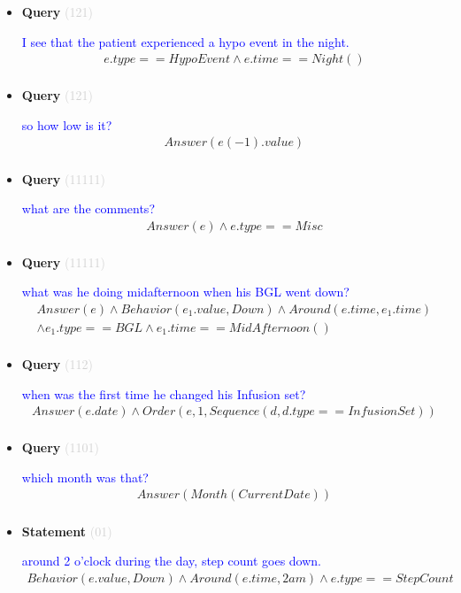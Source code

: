 \documentclass[11pt]{article}
\newcommand{\key}[1]{\textcolor{lightgray}{#1}}
\newcounter{CQuery}
\newcounter{CStatement}
\begin{document}
\begin{itemize}
\item
\textbf{Query\theCQuery} \key{(121)} \addtocounter{CQuery}{1}
\textcolor{blue}{ I see that the patient experienced a hypo event in the night. }
\begin{multline*}
e.type==HypoEvent \wedge e.time==Night() \\ 
\end{multline*}


\item
\textbf{Query\theCQuery} \key{(121)} \addtocounter{CQuery}{1}
\textcolor{blue}{ so how low is it? }
\begin{multline*}
Answer(e(-1).value) \\ 
\end{multline*}


\item
\textbf{Query\theCQuery} \key{(11111)} \addtocounter{CQuery}{1}
\textcolor{blue}{ what are the comments? }
\begin{multline*}
Answer(e) \wedge e.type==Misc \\ 
\end{multline*}


\item
\textbf{Query\theCQuery} \key{(11111)} \addtocounter{CQuery}{1}
\textcolor{blue}{ what was he doing midafternoon when his BGL went down? }
\begin{multline*}
Answer(e) \wedge Behavior(e_1.value, Down) \wedge Around(e.time, e_1.time) \\ 
\wedge e_1.type==BGL \wedge e_1.time==MidAfternoon() \\ 
\end{multline*}


\item
\textbf{Query\theCQuery} \key{(112)} \addtocounter{CQuery}{1}
\textcolor{blue}{ when was the first time he changed his Infusion set? }
\begin{multline*}
Answer(e.date) \wedge Order(e, 1, Sequence(d, d.type==InfusionSet)) \\ 
\end{multline*}


\item
\textbf{Query\theCQuery} \key{(1101)} \addtocounter{CQuery}{1}
\textcolor{blue}{ which month was that? }
\begin{multline*}
Answer(Month(CurrentDate)) \\ 
\end{multline*}


\item
\textbf{Statement\theCStatement} \key{(01)} \addtocounter{CStatement}{1}
\textcolor{blue}{ around 2 o'clock during the day, step count goes down. }
\begin{multline*}
Behavior(e.value, Down) \wedge Around(e.time, 2am) \wedge e.type==StepCount \\ 
\end{multline*}



\end{itemize}
\end{document}
